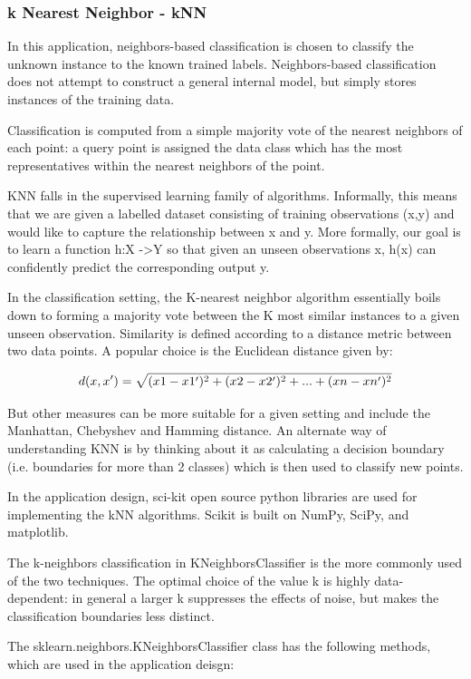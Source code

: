 \documentclass[sigconf]{acmart}
\begin{document}
\subsubsection{k Nearest Neighbor - kNN}
\cite{Kevin2016} In this application, neighbors-based classification is chosen to classify the unknown instance to the known trained labels. Neighbors-based classification does not attempt to construct a general internal model, but simply stores instances of the training data.


Classification is computed from a simple majority vote of the nearest neighbors of each point: a query point is assigned the data class which has the most representatives within the nearest neighbors of the point.


KNN falls in the supervised learning family of algorithms. Informally, this means that we are given a labelled dataset consisting of training observations (x,y) and would like to capture the relationship between x and y. More formally, our goal is to learn a function h:X ->Y so that given an unseen observations x, h(x) can confidently predict the corresponding output y.


In the classification setting, the K-nearest neighbor algorithm essentially boils down to forming a majority vote between the K most similar instances to a given unseen observation. Similarity is defined according to a distance metric between two data points. A popular choice is the Euclidean distance given by:


\[
d(x,x')=\sqrt{(x1-x1\rq)^2+(x2-x2\rq)^2+...+(xn-xn\rq)^2}
\]


But other measures can be more suitable for a given setting and include the Manhattan, Chebyshev and Hamming distance. 
An alternate way of understanding KNN is by thinking about it as calculating a decision boundary (i.e. boundaries for more than 2 classes) which is then used to classify new points.

In the application design, sci-kit open source python libraries are used for implementing the kNN algorithms. Scikit is built on NumPy, SciPy, and matplotlib. 

The k-neighbors classification in KNeighborsClassifier is the more commonly used of the two techniques. The optimal choice of the value k is highly data-dependent: in general a larger k suppresses the effects of noise, but makes the classification boundaries less distinct.

The sklearn.neighbors.KNeighborsClassifier class has the following methods, which are used in the application deisgn:
\end{document}
